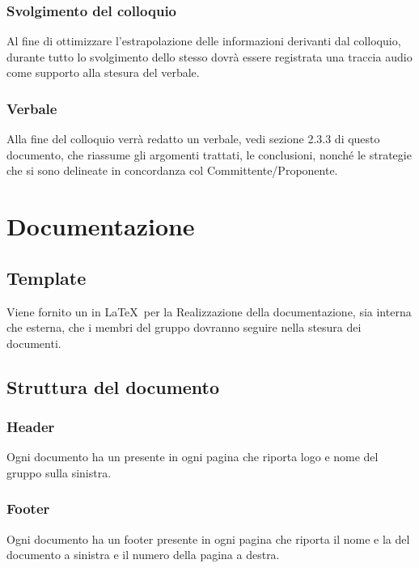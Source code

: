 \subsubsection{Svolgimento del colloquio}
Al fine di ottimizzare l'estrapolazione delle informazioni derivanti dal colloquio, durante tutto lo svolgimento dello stesso dovrà essere registrata una traccia audio come supporto alla stesura del verbale.

\subsubsection{Verbale}
\label{3.4.3}
Alla fine del colloquio verrà redatto un verbale, vedi sezione 2.3.3 di questo documento, che riassume gli argomenti trattati, le conclusioni, nonché le strategie che si sono delineate in concordanza col Committente/Proponente.

\newpage
\section{Documentazione}
\label{5.0}

\subsection{Template}
\label{5.1}
Viene fornito un  in \LaTeX\ per la Realizzazione della documentazione, sia interna che esterna, che i membri del gruppo dovranno seguire nella stesura dei documenti.

\subsection{Struttura del documento}
\label{5.2}

\subsubsection{Header}
\label{5.2.1}
Ogni documento ha un  presente in ogni pagina che riporta logo e nome del gruppo sulla sinistra.

\subsubsection{Footer}
\label{5.2.2}
Ogni documento ha un footer presente in ogni pagina che riporta il nome e la  del documento a sinistra e il numero della pagina a destra.

